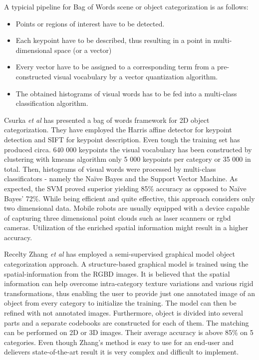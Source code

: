 \documentclass[a4paper,10pt]{article}
\begin{document}
  A typicial pipeline for Bag of Words scene or object categorization is as follows:
  \begin{itemize}
  \item Points or regions of interest have to be detected.
  \item Each keypoint have to be described, thus resulting in a point in multi-dimensional space (or a vector)
  \item Every vector have to be assigned to a corresponding term from a pre-constructed visual vocabulary by a vector 
  quantization algorithm.
  \item The obtained histograms of visual words has to be fed into a multi-class classification algorithm.
  \end{itemize}
  
  Csurka \textit{et al} \cite{csurka2004visual} has presented a bag of words framework for 2D object categorization. They have employed the
  Harris affine detector for keypoint detection and SIFT for keypoint description. Even tough the training set has produced circa. 640 000 
  keypoints the visual vocabulary has been constructed by clustering with kmeans algorithm only 5 000 keypoints per category or 35 000 in 
  total. Then, histograms of visual words were processed by multi-class classificators - namely the Na\"{i}ve Bayes and the Support Vector Machine.
  As expected, the SVM proved superior yielding 85\% accuracy as opposed to Na\"{i}ve Bayes' 72\%. While being efficient and quite effective, this
  approach considers only two dimensional data. Mobile robots are usually equipped with a device capable of capturing three dimensional point clouds
  such as laser scanners or rgbd cameras. Utilization of the enriched spatial information might result in a higher accuracy.
  
  Recelty Zhang \textit{et al} \cite{zhangcategory} has employed a semi-supervised graphical model object categorization approach. 
  A structure-based graphical model is trained using the spatial-information from the RGBD images. It is believed that the spatial
  information can help overcome intra-category texture variations and various rigid transformations, thus enabling the user to provide
  just one annotated image of an object from every category to initialize the training. The model can then be refined with not annotated images.
  Furthermore, object is divided into several parts and a separate codebooks are constructed for each of them. The matching can be performed 
  on 2D or 3D images. Their average accuracy is above 85\% on 5 categories. Even though Zhang's method is easy to use for an end-user and 
  delievers state-of-the-art result it is very complex and difficult to implement.
  
\end{document}
